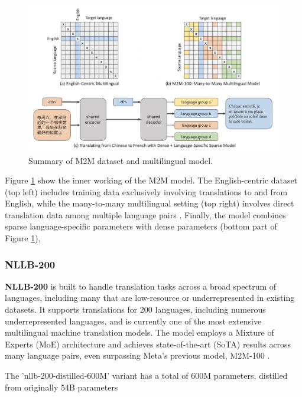 \documentclass[a4paper]{article}
\begin{document}
\begin{figure}[htbp]
    \centering
    \includegraphics[width=0.9\linewidth]{images/m2m.png}
    \caption{Summary of M2M dataset and multilingual model.}
    \label{fig:m2m}
\end{figure}

Figure \ref{fig:m2m} show the inner working of the M2M model. The English-centric dataset (top left) includes training data exclusively involving translations to and from English, while the many-to-many multilingual setting (top right) involves direct translation data among multiple language pairs \cite{fan-2020-m2m100}. Finally, the model combines sparse language-specific parameters with dense parameters (bottom part of Figure \ref{fig:m2m}),

\subsubsection{NLLB-200}

\textbf{NLLB-200} \cite{nllb200-2020} is built to handle translation tasks across a broad spectrum of languages, including many that are low-resource or underrepresented in existing datasets. It supports translations for 200 languages, including numerous underrepresented languages, and is currently one of the most extensive multilingual machine translation models. The model employs a Mixture of Experts (MoE) architecture and achieves state-of-the-art (SoTA) results across many language pairs, even surpassing Meta's previous model, M2M-100 \cite{nllb200-2020}.

The 'nllb-200-distilled-600M' variant has a total of 600M parameters, distilled from originally 54B parameters \cite{nllb200-2020}
\end{document}
